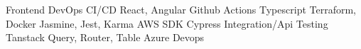 

\begin{center}
\begin{skills}
                       {Frontend}                        {DevOps CI/CD}
              {React, Angular}                  {Github Actions}
         {Typescript}                      {Terraform, Docker}
              {Jasmine, Jest, Karma}            {AWS SDK}
       {Cypress}                         {Integration/Api Testing}
                {Tanstack Query, Router, Table}   {Azure Devops}
\end{skills}
\end{center}